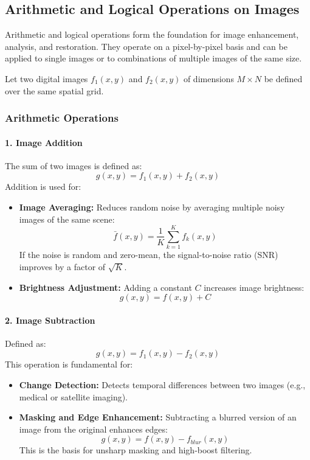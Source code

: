 \documentclass[12pt,a4paper]{AnantDocumentation}
\begin{document}
\subsection{Arithmetic and Logical Operations on Images}

Arithmetic and logical operations form the foundation for image enhancement, analysis, and restoration.  
They operate on a pixel-by-pixel basis and can be applied to single images or to combinations of multiple images of the same size.

Let two digital images $f_1(x,y)$ and $f_2(x,y)$ of dimensions $M \times N$ be defined over the same spatial grid.

\subsubsection{Arithmetic Operations}

\paragraph{1. Image Addition}
The sum of two images is defined as:
\begin{equation}
g(x, y) = f_1(x, y) + f_2(x, y)
\end{equation}
Addition is used for:
\begin{itemize}
\item \textbf{Image Averaging:} Reduces random noise by averaging multiple noisy images of the same scene:
\begin{equation}
\bar{f}(x, y) = \frac{1}{K} \sum_{k=1}^{K} f_k(x, y)
\end{equation}
If the noise is random and zero-mean, the signal-to-noise ratio (SNR) improves by a factor of $\sqrt{K}$.
\item \textbf{Brightness Adjustment:} Adding a constant $C$ increases image brightness:
\begin{equation}
g(x, y) = f(x, y) + C
\end{equation}
\end{itemize}

\paragraph{2. Image Subtraction}
Defined as:
\begin{equation}
g(x, y) = f_1(x, y) - f_2(x, y)
\end{equation}
This operation is fundamental for:
\begin{itemize}
\item \textbf{Change Detection:} Detects temporal differences between two images (e.g., medical or satellite imaging).
\item \textbf{Masking and Edge Enhancement:} Subtracting a blurred version of an image from the original enhances edges:
\begin{equation}
g(x, y) = f(x, y) - f_{blur}(x, y)
\end{equation}
This is the basis for unsharp masking and high-boost filtering.
\end{itemize}
\end{document}
